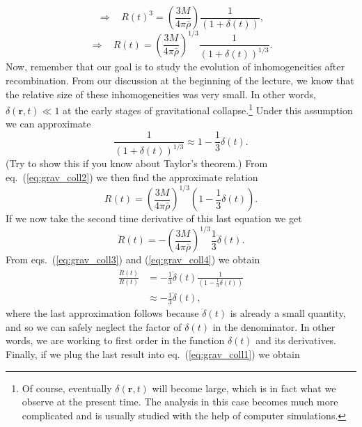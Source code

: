 \begin{equation}
\Rightarrow~~~~ R(t)^3=\left(\frac{3M}{4\pi\bar{\rho}}\right)\frac{1}{\left(1+\delta(t)\right)},
\end{equation}
\begin{equation} \label{eq:grav_coll2}
\Rightarrow~~~~ R(t)=\left(\frac{3M}{4\pi\bar{\rho}}\right)^{1/3}\frac{1}{\left(1+\delta(t)\right)^{1/3}}.
\end{equation}
Now, remember that our goal is to study the evolution of inhomogeneities after recombination. From our discussion at the beginning of the lecture, we know that the relative size of these inhomogeneities was very small. In other words, $\delta(\mathbf{r},t)\ll1$ at the early stages of gravitational collapse.\footnote{Of course, eventually $\delta(\mathbf{r},t)$ will become large, which is in fact what we observe at the present time. The analysis in this case becomes much more complicated and is usually studied with the help of computer simulations.} Under this assumption we can approximate
\begin{equation}
\frac{1}{\left(1+\delta(t)\right)^{1/3}}\approx 1-\frac{1}{3}\delta(t).
\end{equation}
(Try to show this if you know about Taylor's theorem.) From eq.\ (\ref{eq:grav_coll2}) we then find the approximate relation
\begin{equation} \label{eq:grav_coll3}
R(t)=\left(\frac{3M}{4\pi\bar{\rho}}\right)^{1/3}\left(1-\frac{1}{3}\delta(t)\right).
\end{equation}
If we now take the second time derivative of this last equation we get
\begin{equation} \label{eq:grav_coll4}
\ddot{R}(t)=-\left(\frac{3M}{4\pi\bar{\rho}}\right)^{1/3}\frac{1}{3}\ddot{\delta}(t).
\end{equation}
From eqs.\ (\ref{eq:grav_coll3}) and (\ref{eq:grav_coll4}) we obtain
\begin{equation}
\begin{split}
\frac{\ddot{R}(t)}{R(t)}&=-\frac{1}{3}\ddot{\delta}(t)\frac{1}{\left(1-\frac{1}{3}\delta(t)\right)}\\
&\approx -\frac{1}{3}\ddot{\delta}(t),
\end{split}
\end{equation}
where the last approximation follows because $\ddot{\delta}(t)$ is already a small quantity, and so we can safely neglect the factor of $\delta(t)$ in the denominator. In other words, we are working to first order in the function $\delta(t)$ and its derivatives. Finally, if we plug the last result into eq.\ (\ref{eq:grav_coll1}) we obtain
